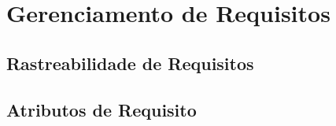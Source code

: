 \chapter[Gerenciamento de Requisitos]{Gerenciamento de Requisitos}\label{cap1}
\section{Rastreabilidade de Requisitos}
\section{Atributos de Requisito}
